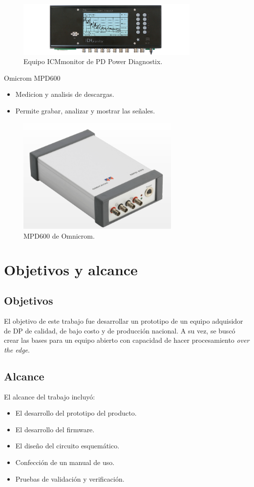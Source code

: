 \begin{figure}[h!]
	\centering
	\includegraphics[width=90mm]{./Figures/arte2.png}
	\caption{Equipo ICMmonitor de PD Power Diagnostix.}
	\label{fig:arte2}
\end{figure}


Omicrom MPD600 \citep{mpdWeb:1}
\begin{itemize}
\item Medicion y analisis de descargas.
\item Permite grabar, analizar y mostrar las señales.
\end{itemize}

\begin{figure}[h!]
	\centering
	\includegraphics[width=80mm]{./Figures/arte3.png}
	\caption{MPD600 de Omnicrom.}
	\label{fig:arte3}
\end{figure}

\section{Objetivos y alcance}
\subsection{Objetivos}
El objetivo de este trabajo fue desarrollar un prototipo de un equipo adquisidor de DP de calidad, de bajo costo y de producción nacional. A su vez, se buscó crear las bases para un equipo abierto con capacidad de hacer procesamiento \textit{over the edge}. 

\subsection{Alcance}
El alcance del trabajo incluyó:
\begin{itemize}
\item El desarrollo del prototipo del producto.
\item El desarrollo del firmware.
\item El diseño del circuito esquemático.
\item Confección de un manual de uso.
\item Pruebas de validación y verificación.
\end{itemize}

